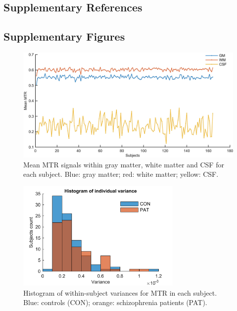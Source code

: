 \begin{refsection}
\subsection*{Supplementary References}
\printbibliography[heading=none]

\newpage
\subsection*{Supplementary Figures}
\begin{figure}[H]
\centering
  \includegraphics[width=\linewidth]{images/mtrFigS1.jpg}
  \caption{\small Mean MTR signals within gray matter, white matter and CSF for each subject. Blue: gray matter; red: white matter; yellow: CSF.}
  \label{mtrFigS1}
\end{figure}

\begin{figure}[H]
\centering
  \includegraphics[width=8cm]{images/mtrFigS2.png}
  \caption{\small Histogram of within-subject variances for MTR in each subject. Blue: controls (CON); orange: schizophrenia patients (PAT).}
  \label{mtrFigS2}
\end{figure}


\end{refsection}
